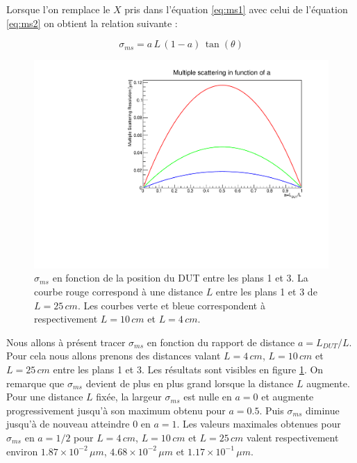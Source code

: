   Lorsque l'on remplace le $X$ pris dans l'\'equation \ref{eq:ms1} avec celui de l'\'equation \ref{eq:ms2} on obtient la relation suivante :
  
  \begin{equation}
   \sigma_{ms} = a \, L \, (1-a) \, \tan(\theta)
  \end{equation}

  \begin{figure}[!htb]
    \begin{center}
      \includegraphics[scale=0.6]{./figures/Plot_reso_vs_z/multiple_scattering_4cm_pl1-pl3.pdf}
      \caption{$\sigma_{ms}$ en fonction de la position du DUT entre les plans 1 et 3. La courbe rouge correspond \`a une distance $L$ entre les plans 1 et 3 de $L = 25 \, cm$. Les courbes verte et bleue correspondent \`a respectivement $L = 10 \, cm$ et $L = 4 \, cm$. }
      \label{fig:diff_multiple_plot}
    \end{center}
  \end{figure}
  
  Nous allons \`a pr\'esent tracer $\sigma_{ms}$ en fonction du rapport de distance $a=L_{DUT}/L$. Pour cela nous allons prenons des distances valant $L = 4 \, cm$, $L = 10 \, cm$ et $L = 25 \, cm$ entre les plans 1 et 3. Les r\'esultats sont visibles en figure \ref{fig:diff_multiple_plot}. On remarque que $\sigma_{ms}$ devient de plus en plus grand lorsque la distance $L$ augmente. Pour une distance $L$ fix\'ee, la largeur $\sigma_{ms}$ est nulle en $a=0$ et augmente progressivement jusqu'\`a son maximum obtenu pour $a=0.5$. Puis $\sigma_{ms}$ diminue jusqu'\`a de nouveau atteindre $0$ en $a=1$. Les valeurs maximales obtenues pour $\sigma_{ms}$ en $a=1/2$ pour $L = 4 \, cm$, $L = 10 \, cm$ et $L= 25 \, cm$ valent respectivement environ $1.87 \times 10^{-2} \, \mu m$, $4.68 \times 10^{-2} \, \mu m$ et $1.17 \times 10^{-1} \, \mu m$.
  
